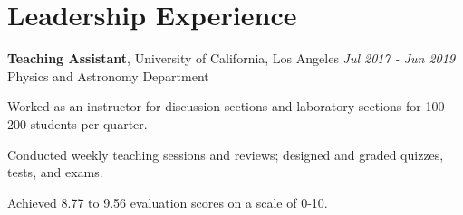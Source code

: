 \section{\mysidestyle Leadership Experience}
\textbf{Teaching Assistant}, University of California, Los Angeles {\hfill \textsl{Jul 2017 - Jun 2019}}\\
Physics and Astronomy Department
\begin{list2}
    \item {Worked as an instructor for discussion sections and laboratory sections for 100-200 students per quarter.}
    \item {Conducted weekly teaching sessions and reviews; designed and graded quizzes, tests, and exams.}
    \item {Achieved 8.77 to 9.56 evaluation scores on a scale of 0-10.}
\end{list2}

